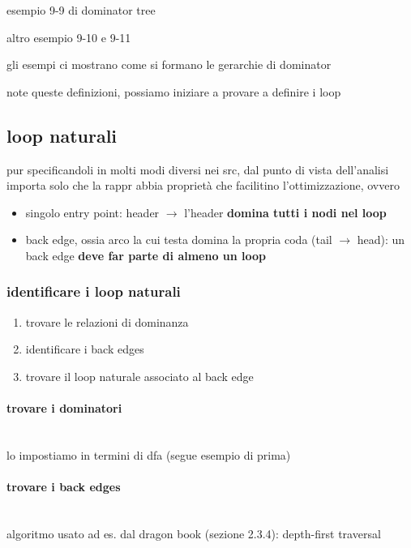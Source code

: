 esempio 9-9 di dominator tree

altro esempio 9-10 e 9-11

gli esempi ci mostrano come si formano le gerarchie di dominator

note queste definizioni, possiamo iniziare a provare a definire i loop

\subsection{loop naturali}

pur specificandoli in molti modi diversi nei src, dal punto di vista dell'analisi importa solo che la rappr abbia propriet\`a che facilitino l'ottimizzazione, ovvero
\begin{itemize}
  \item singolo entry point: header $\rightarrow$ l'header \textbf{domina tutti i nodi nel loop}
  \item back edge, ossia arco la cui testa domina la propria coda (tail $\rightarrow$ head): un back edge \textbf{deve far parte di almeno un loop}
\end{itemize}

\subsubsection{identificare i loop naturali}

\begin{enumerate}
  \item trovare le relazioni di dominanza
  \item identificare i back edges
  \item trovare il loop naturale associato al back edge
\end{enumerate}

\paragraph{trovare i dominatori}~\\

lo impostiamo in termini di dfa (segue esempio di prima)

\paragraph{trovare i back edges}~\\

algoritmo usato ad es. dal dragon book (sezione 2.3.4): depth-first traversal

